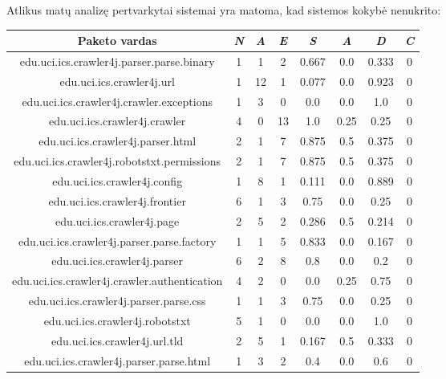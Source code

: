 Atlikus matų analizę pertvarkytai sistemai yra matoma, kad sistemos kokybė nenukrito:
\begin{center}
    \begin{tabular}{|c|c|c|c|c|c|c|c|}
        \hline
        Paketo vardas & \textit{N} & \textit{A} & \textit{E} & \textit{S} & \textit{A} & \textit{D} & \textit{C} \\ [0.5ex]
        \hline\hline
        edu.uci.ics.crawler4j.parser.parse.binary & 1 & 1 & 2 & 0.667 & 0.0 & 0.333 & 0\\
        \hline
        edu.uci.ics.crawler4j.url & 1 & 12 & 1 & 0.077 & 0.0 & 0.923 & 0\\
        \hline
        edu.uci.ics.crawler4j.crawler.exceptions & 1 & 3 & 0 & 0.0 & 0.0 & 1.0 & 0 \\
        \hline
        edu.uci.ics.crawler4j.crawler & 4 & 0 & 13 & 1.0 & 0.25 & 0.25 & 0  \\
        \hline
        edu.uci.ics.crawler4j.parser.html & 2 & 1 & 7 & 0.875 & 0.5 & 0.375 & 0 \\
        \hline
        edu.uci.ics.crawler4j.robotstxt.permissions & 2 & 1 & 7 & 0.875 & 0.5 & 0.375 & 0\\
        \hline
        edu.uci.ics.crawler4j.config & 1 & 8 & 1 & 0.111 & 0.0 & 0.889 & 0 \\
        \hline
        edu.uci.ics.crawler4j.frontier & 6 & 1 & 3 & 0.75 & 0.0 & 0.25 & 0  \\
        \hline
        edu.uci.ics.crawler4j.page & 2 & 5 & 2 & 0.286 & 0.5 & 0.214 & 0 \\
        \hline
        edu.uci.ics.crawler4j.parser.parse.factory & 1 & 1 & 5 & 0.833 & 0.0 & 0.167 & 0 \\
        \hline
        edu.uci.ics.crawler4j.parser & 6 & 2 & 8 & 0.8 & 0.0 & 0.2 &0 \\
        \hline
        edu.uci.ics.crawler4j.crawler.authentication & 4 & 2 & 0 & 0.0 & 0.25 & 0.75 & 0 \\
        \hline
        edu.uci.ics.crawler4j.parser.parse.css & 1 & 1 & 3 & 0.75 & 0.0 & 0.25 & 0\\
        \hline
        edu.uci.ics.crawler4j.robotstxt & 5 & 1 & 0 & 0.0 & 0.0 & 1.0 & 0 \\
        \hline
        edu.uci.ics.crawler4j.url.tld & 2 & 5 & 1 & 0.167 & 0.5 & 0.333 & 0 \\
        \hline
        edu.uci.ics.crawler4j.parser.parse.html & 1 & 3 & 2 & 0.4 & 0.0 & 0.6 & 0\\

\end{tabular}
\end{center}
